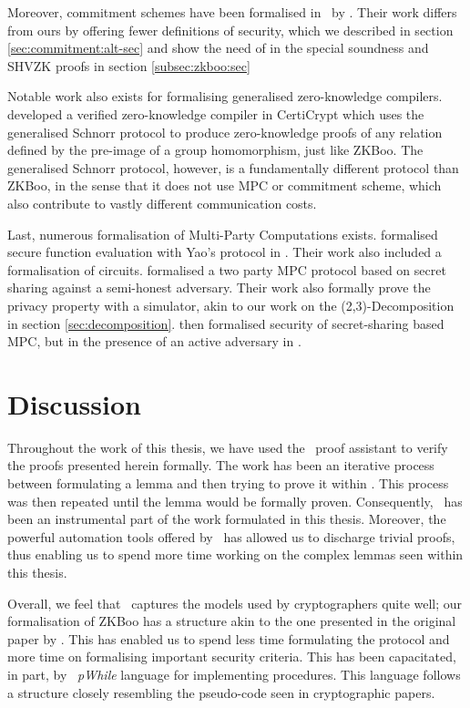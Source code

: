 Moreover, commitment schemes have been formalised in \easycrypt\ by
\cite{DBLP:journals/corr/MetereD17}. Their work differs from ours by offering
fewer definitions of security, which we described in section
\ref{sec:commitment:alt-sec} and show the need of in the special soundness and
SHVZK proofs in section \ref{subsec:zkboo:sec}

Notable work also exists for formalising generalised zero-knowledge compilers.
\cite{zkcrypt} developed a verified zero-knowledge compiler in CertiCrypt
which uses the generalised Schnorr protocol to produce zero-knowledge proofs of
any relation defined by the pre-image of a group homomorphism, just like ZKBoo.
The generalised Schnorr protocol, however, is a fundamentally different protocol
than ZKBoo, in the sense that it does not use MPC or commitment scheme, which
also contribute to vastly different communication costs.

Last, numerous formalisation of Multi-Party Computations exists.
\cite{Yao} formalised secure function evaluation with Yao's protocol in
\easycrypt.
Their work also included a formalisation of circuits.
\cite{DBLP:journals/corr/abs-1805-12482} formalised a two party MPC protocol
based on secret sharing against a semi-honest adversary. Their work also
formally prove the privacy property with a simulator, akin to our work on the
(2,3)-Decomposition in section \ref{sec:decomposition}.
\cite{DBLP:journals/corr/abs-1806-07197} then formalised security of
secret-sharing based MPC, but in the presence of an active adversary in \easycrypt.

\section{Discussion}
\label{sec:discussion}
Throughout the work of this thesis, we have used the \easycrypt\ proof assistant
to verify the proofs presented herein formally.
The work has been an iterative process between formulating a lemma and then
trying to prove it within \easycrypt. This process was then repeated until the
lemma would be formally proven. Consequently, \easycrypt\ has been an
instrumental part of the work formulated in this thesis. Moreover, the powerful
automation tools offered by \easycrypt\ has allowed us to discharge trivial
proofs, thus enabling us to spend more time working on the complex lemmas seen
within this thesis.

Overall, we feel that \easycrypt\ captures the models used by cryptographers
quite well; our formalisation of ZKBoo has a structure akin to the one presented
in the original paper by \cite{zkboo}. This has enabled us to spend less time
formulating the protocol and more time on formalising important security criteria.
This has been capacitated, in part, by \easycrypt\ \textit{pWhile} language for
implementing procedures. This language follows a structure closely resembling the
pseudo-code seen in cryptographic papers.

